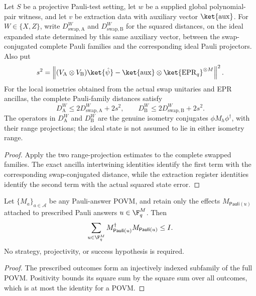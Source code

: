 \begin{theorem}
\label{thm:pauli-component-isometry-transfer-support}
\leanok
{}
Let $S$ be a projective Pauli-test setting, let $w$ be a supplied global
polynomial-pair witness, and let $v$ be extraction data with auxiliary vector
$\ket{\mathrm{aux}}$.  For $W\in\{X,Z\}$, write
$D_{\mathrm{swap},\mathrm A}^W$ and
$D_{\mathrm{swap},\mathrm B}^W$ for the squared distances, on the ideal
expanded state determined by this same auxiliary vector, between the
swap-conjugated complete Pauli families and the corresponding ideal Pauli
projectors.  Also put
\[
 s^2=\left\|(V_{\mathrm A}\otimes V_{\mathrm B})\ket{\hat\psi}
   -\ket{\mathrm{aux}}\otimes\ket{\mathrm{EPR}_q}^{\otimes M}\right\|^2.
\]
For the local isometries obtained from the actual swap unitaries and EPR
ancillas, the complete Pauli-family distances satisfy
\[
 D_{\mathrm A}^W\leq2D_{\mathrm{swap},\mathrm A}^W+2s^2,
 \qquad
 D_{\mathrm B}^W\leq2D_{\mathrm{swap},\mathrm B}^W+2s^2.
\]
The operators in $D_{\mathrm A}^W$ and $D_{\mathrm B}^W$ are the genuine
isometry conjugates $\phi M_h\phi^\dagger$, with their range projections;
the ideal state is not assumed to lie in either isometry range.
\end{theorem}
\begin{proof}
\leanok
{}
Apply the two range-projection estimates to the complete swapped families.
The exact ancilla intertwining identities identify the first term with the
corresponding swap-conjugated distance, while the extraction register
identities identify the second term with the actual squared state error.
\end{proof}

\begin{lemma}
\label{lem:pauli-raw-effects-square-sum-support}
\leanok
{}
Let $\{M_a\}_{a\in\mathcal A}$ be any Pauli-answer POVM, and retain only the
effects $M_{\mathsf{Pauli}(u)}$ attached to prescribed Pauli answers
$u\in\F_q^M$.  Then
\[
 \sum_{u\in\F_q^M}
   M_{\mathsf{Pauli}(u)}^\dagger M_{\mathsf{Pauli}(u)}\leq I.
\]
No strategy, projectivity, or success hypothesis is required.
\end{lemma}
\begin{proof}
\leanok
The prescribed outcomes form an injectively indexed subfamily of the full
POVM.  Positivity bounds its square sum by the square sum over all outcomes,
which is at most the identity for a POVM.
\end{proof}

